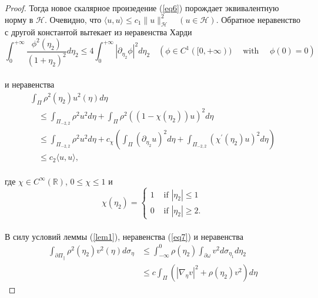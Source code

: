 \documentclass[12pt,titlepage]{report}
\begin{document}
\begin{proof}
	 Тогда новое скалярное произедение (\ref{eq6}) порождает эквивалентную норму в $\mathcal{H}$. Очевидно, что $\langle u, u\rangle \leq c_{1}\|u\|_{\mathcal{H}}^{2} \quad(u \in \mathcal{H})$. Обратное неравенство с другой константой вытекает из неравенства Харди\\
	 $$\int_{0}^{+\infty} \frac{\phi^{2}\left(\eta_{2}\right)}{\left(1+\eta_{2}\right)^{2}} d \eta_{2} \leq 4 \int_{0}^{+\infty}\left|\partial_{\eta_{2}} \phi\right|^{2} d \eta_{2} \quad\left(\phi \in C^{1}([0,+\infty)) \quad \text { with } \quad \phi(0)=0\right)$$\\
	 и неравенства\\
	 \begin{equation}
	 \label{eq7}
	 \begin{array}{l}
		 \int_{\Pi} \rho^{2}\left(\eta_{2}\right) u^{2}(\eta) d \eta \\
		 \quad \leq \int_{\Pi_{-2,2}} \rho^{2} u^{2} d \eta+\int_{\Pi} \rho^{2}\left(\left(1-\chi\left(\eta_{2}\right)\right) u\right)^{2} d \eta \\
		 \quad \leq \int_{\Pi_{-2,2}} \rho^{2} u^{2} d \eta+c_{\chi}\left(\int_{\Pi}\left(\partial_{\eta_{2}} u\right)^{2} d \eta+\int_{\Pi_{-2,2}}\left(\chi^{\prime}\left(\eta_{2}\right) u\right)^{2} d \eta\right) \\
		 \quad \leq c_{2}\langle u, u\rangle,
		 \end{array}
	 \end{equation}\\
	 где $\chi \in C^{\infty}(\mathbb{R})$, $0 \leq \chi \leq 1$ и
	 \begin{equation}
	 \label{eq8}
		 \chi\left(\eta_{2}\right)=\left\{\begin{array}{ll}
		 1 & \text { if }\left|\eta_{2}\right| \leq 1 \\
		 0 & \text { if }\left|\eta_{2}\right| \geq 2.
		 \end{array}\right.
	 \end{equation}\\
	 В силу условий леммы (\ref{lem1}), неравенства (\ref{eq7}) и неравенства \\
	 \begin{equation}
	 \label{eq9}
	 	\begin{aligned}
		 \int_{\partial \Pi_{\|}} \rho^{2}\left(\eta_{2}\right) v^{2}(\eta) d \sigma_{\eta} & \leq \int_{-\infty}^{0} \rho\left(\eta_{2}\right) \int_{\partial \omega} v^{2} d \sigma_{\eta_{1}} d \eta_{2} \\
		 & \leq c \int_{\Pi}\left(\left|\nabla_{\eta} v\right|^{2}+\rho\left(\eta_{2}\right) v^{2}\right) d \eta

\end{aligned}
\end{equation}
\end{proof}
\end{document}
